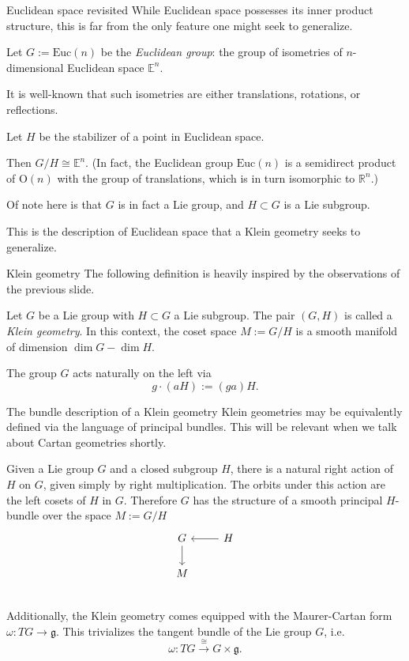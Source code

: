 \documentclass[handout]{beamer}
\newcommand{\RR}{\mathbb{R}}
\newcommand{\EE}{\mathbb{E}}
\begin{document}
\begin{frame}{Euclidean space revisited}
  While Euclidean space possesses its inner product structure, this is far from the only feature one might seek to generalize.

  Let $G:=\text{Euc}(n)$ be the \emph{Euclidean group}: the group of isometries of $n$-dimensional Euclidean space $\EE^n$.

  It is well-known that such isometries are either translations, rotations, or reflections.

  Let $H$ be the stabilizer of a point in Euclidean space. 

  Then $G/H \cong \EE^n$. (In fact, the Euclidean group $\text{Euc}(n)$ is a semidirect product of $\text{O}(n)$ with the group of translations, which is in turn isomorphic to $\RR^n$.)
  
  Of note here is that $G$ is in fact a Lie group, and $H\subset G$ is a Lie subgroup.

  This is the description of Euclidean space that a Klein geometry seeks to generalize.
\end{frame}

\begin{frame}{Klein geometry}
  The following definition is heavily inspired by the observations of the previous slide.
  \begin{definition}
    Let $G$ be a Lie group with $H \subset G$ a Lie subgroup. 
    The pair $(G,H)$ is called a \emph{Klein geometry}.
    In this context, the coset space $M:=G/H$ is a smooth manifold of dimension $\dim G - \dim H$.
  \end{definition}
  The group $G$ acts naturally on the left via 
  \[
    g \cdot (aH) := (ga)H.
  \]
\end{frame}

\begin{frame}{The bundle description of a Klein geometry}
  Klein geometries may be equivalently defined via the language of principal bundles. 
  This will be relevant when we talk about Cartan geometries shortly. 

  Given a Lie group $G$ and a closed subgroup $H$, there is a natural right action of $H$ on $G$, given simply by right multiplication. 
  The orbits under this action are the left cosets of $H$ in $G$. 
  Therefore $G$ has the structure of a smooth principal $H$-bundle over the space $M:=G/H$
  \[
    \begin{tikzcd}[ampersand replacement=\&]
      G  \arrow[d] \& H \arrow[l]\\
      M \& {} \\
    \end{tikzcd}
  \]
  Additionally, the Klein geometry comes equipped with the Maurer-Cartan form $\omega : TG \to \mathfrak{g}$.
  This trivializes the tangent bundle of the Lie group $G$, i.e. 
  \[
    \omega : TG \overset{\cong}{\longrightarrow} G \times \mathfrak{g}.
  \]
\end{frame}
\end{document}
